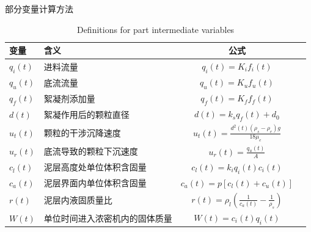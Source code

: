 \begin{table}[!ht]
\caption{部分变量计算方法}

    \addtocounter{table}{-1}
    \vspace{-0.2cm}
    \renewcommand{\tablename}{Table}
    \caption{Definitions for part intermediate variables}
    \renewcommand{\tablename}{表}
    \vspace{0.4cm}

\label{tab:variable_calculation}
\begin{tabular}{@{}lp{2.6cm}cc@{}}
\toprule 变量        & 含义              & 公式
\\ \midrule
$q_i(t)$  & 进料流量            & $q _ { i } ( t ) = K _ { i } f _ { i } ( t )$                                                                \\
$q_u(t)$  & 底流流量            & $q _ { u } ( t ) = K _ { u } f _ { u } ( t )$                                                                \\
$q_f(t)$  & 絮凝剂添加量          & $q _ { f } ( t ) = K _ { f } f _ { f } ( t )$                                                                \\
$d(t)$    & 絮凝作用后的颗粒直径      & $d ( t ) = k _ { s } q _ { f } ( t ) + d _ { 0 }$                                                            \\
$u_t(t)$  & 颗粒的干涉沉降速度       & $u _ { t} ( t ) = \frac { d ^ { 2 } ( t ) \left( \rho _ { s } - \rho _ { e } \right) g } { 18 \mu _ { e } }$ \\
$u_r(t)$  & 底流导致的颗粒下沉速度     & $u _ { r } ( t ) = \frac { q _ { u } ( t ) } { A  }$                                                         \\
$c_l(t)$  & 泥层高度处单位体积含固量    & $c _ { l } ( t ) = k _ { i } q _ { i } ( t ) c _ { i } ( t )$                                                \\
$c_a(t)$  & 泥层界面内单位体积含固量    & $c _ { a } ( t ) = p \left[ c _ { l } ( t ) + c _ { u } ( t ) \right]$                                       \\
$r(t)$  & 泥层内液固质量比    & $r(t)=\rho_{l}\left(\frac{1}{c_ a(t)}-\frac{1}{\rho_s}\right)$                                        \\
$W ( t )$ & 单位时间进入浓密机内的固体质量 & $W ( t ) = c _ { i } (
t ) q _ { i } ( t )$
\\ \bottomrule
\end{tabular}
\end{table}


